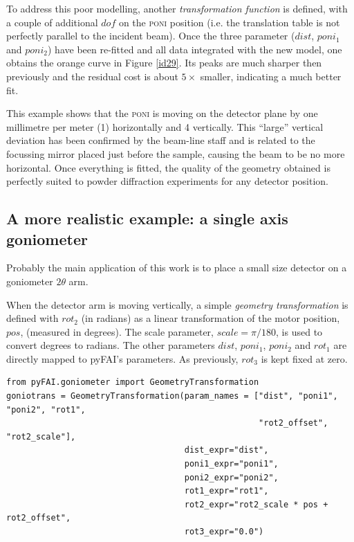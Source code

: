 \documentclass[preprint]{iucr}              %
\begin{document}
 
To address this poor modelling, another \textit{transformation function} is
defined, with a couple of additional $dof$ on the \textsc{poni} position
(i.e. the translation table is not perfectly parallel to the incident beam).
Once the three parameter ($dist$, $poni_1$ and $poni_2$) have been re-fitted and 
all data integrated with the new model, one obtains the orange
curve in Figure \ref{id29}. 
Its peaks are much sharper then previously and the residual cost is
about $5\times$ smaller, indicating a much better fit.

This example shows that the \textsc{poni} is moving on the detector
plane by one millimetre per meter (1\textperthousand) horizontally and 
4 \textperthousand vertically.
This ``large'' vertical deviation has been confirmed by the beam-line staff and
is related to the focussing mirror placed just before the sample, causing the
beam to be no more horizontal.
Once everything is fitted, the quality of the geometry obtained is perfectly
suited to powder diffraction experiments for any detector position.
  
\subsection{A more realistic example: a single axis goniometer}

Probably the main application of this work is to place a small size detector
on a goniometer $2\theta$ arm. 

When the detector arm is moving vertically, a simple \textit{geometry
transformation} is defined with $rot_2$ (in radians) as a
linear transformation of the motor position, $pos$, (measured in degrees).
The scale parameter, $scale = \pi / 180$, is used to convert degrees to radians.
The other parameters $dist$, $poni_1$, $poni_2$ and $rot_1$ are directly mapped
to pyFAI's parameters.
As previously, $rot_3$ is kept fixed at zero.

\begin{verbatim}
from pyFAI.goniometer import GeometryTransformation
goniotrans = GeometryTransformation(param_names = ["dist", "poni1", "poni2", "rot1",
                                                   "rot2_offset", "rot2_scale"],
                                    dist_expr="dist", 
                                    poni1_expr="poni1",
                                    poni2_expr="poni2", 
                                    rot1_expr="rot1", 
                                    rot2_expr="rot2_scale * pos + rot2_offset", 
                                    rot3_expr="0.0")
\end{verbatim}
\end{document}
